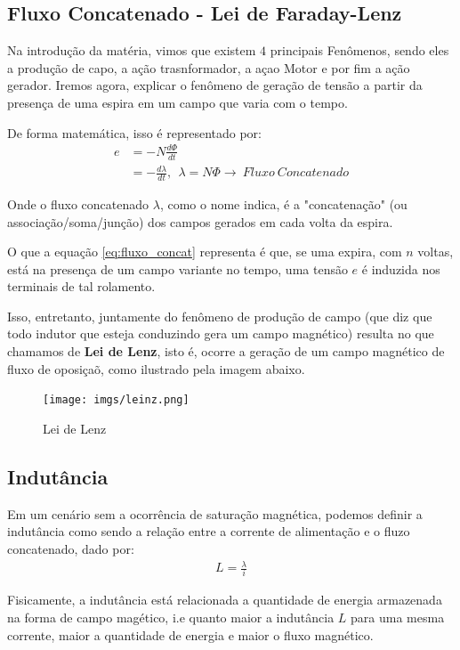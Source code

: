 \documentclass{article}
\newcommand{\n}{\nonumber \\ }
\begin{document}
\subsection{Fluxo Concatenado - Lei de Faraday-Lenz}
Na introdução da matéria, vimos que existem $4$ principais Fenômenos, sendo eles a produção de capo, a ação trasnformador, a açao Motor e por fim a ação gerador. Iremos agora, explicar o fenômeno de geração de tensão a partir da presença de uma espira em um campo que varia com o tempo.

De forma matemática, isso é representado por:
\begin{align}
    e &= -N \frac{d \Phi}{dt} \n
      &= -\frac{d\lambda}{dt}, \ \ \lambda = N\Phi \rightarrow \ Fluxo\ Concatenado
      \label{eq:fluxo_concat}
\end{align}

Onde o fluxo concatenado $\lambda$, como o nome indica, é a "concatenação" (ou associação/soma/junção) dos campos gerados em cada volta da espira.

O que a equação \ref{eq:fluxo_concat} representa é que, se uma expira, com $n$ voltas, está na presença de um campo variante no tempo, uma tensão $e$ é induzida nos terminais de tal rolamento.

Isso, entretanto, juntamente do fenômeno de produção de campo (que diz que todo indutor que esteja conduzindo gera um campo magnético) resulta no que chamamos de \textbf{Lei de Lenz}, isto é, ocorre a geração de um campo magnético de fluxo de oposiçaõ, como ilustrado pela imagem abaixo.
\begin{figure}[h]
    \centering
    \texttt{[image: imgs/leinz.png]}
    \caption{Lei de Lenz}
    \label{fig:leinz}
\end{figure}

\newpage
\subsection{Indutância}
Em um cenário sem a ocorrência de saturação magnética, podemos definir a indutância como sendo a relação entre a corrente de alimentação e o fluzo concatenado, dado por:
\begin{align}
    L = \frac{\lambda}{i}
    \label{eq:indutancia}
\end{align}

Fisicamente, a indutância está relacionada a quantidade de energia armazenada na forma de campo magético, i.e quanto maior a indutância $L$ para uma mesma corrente, maior a quantidade de energia e maior o fluxo magnético.
\end{document}
